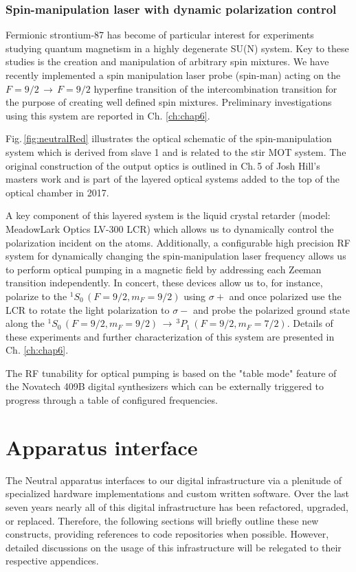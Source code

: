 \subsubsection{Spin-manipulation laser with dynamic polarization control}
Fermionic strontium-87 has become of particular interest for experiments studying quantum magnetism in a highly degenerate SU(N) system.
Key to these studies is the creation and manipulation of arbitrary spin mixtures.
We have recently implemented a spin manipulation laser probe (spin-man) acting on the $F=9/2\,\rightarrow\,F=9/2$ hyperfine transition of the intercombination transition for the purpose of creating well defined spin mixtures.
Preliminary investigations using this system are reported in Ch. \ref{ch:chap6}.

Fig.\,\ref{fig:neutralRed} illustrates the optical schematic of the spin-manipulation system which is derived from slave 1 and is related to the stir MOT system.
The original construction of the output optics is outlined in Ch.\,5 of Josh Hill's masters work \cite{Hill2017} and is part of the layered optical systems added to the top of the optical chamber in 2017.

A key component of this layered system is the liquid crystal retarder (model: MeadowLark Optics LV-300 LCR) which allows us to dynamically control the polarization incident on the atoms.
Additionally, a configurable high precision RF system for dynamically changing the spin-manipulation laser frequency allows us to perform optical pumping in a magnetic field by addressing each Zeeman transition independently.
In concert, these devices allow us to, for instance, polarize to the $^1S_0\,(F=9/2, m_F=9/2)$ using $\sigma+$ and once polarized use the LCR to rotate the light polarization to $\sigma-$ and probe the polarized ground state along the $^1S_0\,(F=9/2,m_F=9/2)\,\rightarrow\,^3P_1\,(F=9/2,m_F=7/2)$.
Details of these experiments and further characterization of this system are presented in Ch. \ref{ch:chap6}.

The RF tunability for optical pumping is based on the "table mode" feature of the Novatech 409B digital synthesizers which can be externally triggered to progress through a table of configured frequencies.

\newpage
\section{Apparatus interface} \label{sec:electronics}
\setcounter{footnote}{0}
The Neutral apparatus interfaces to our digital infrastructure via a plenitude of specialized hardware implementations and custom written software.
Over the last seven years nearly all of this digital infrastructure has been refactored, upgraded, or replaced.
Therefore, the following sections will briefly outline these new constructs, providing references to code repositories when possible.
However, detailed discussions on the usage of this infrastructure will be relegated to their respective appendices.

